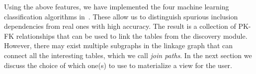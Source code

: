 Using the above features, we have implemented the four machine learning classification algorithms in~\cite{DBLP:conf/webdb/RostinABNL09}. These allow us to distinguish spurious inclusion dependencies from real ones  with high accuracy.
The result is a collection of PK-FK relationships that can be used to link the tables from the discovery module. However, there may exist multiple subgraphs in the linkage graph that can connect all the interesting tables, which we call \emph{join paths}. In the next section we discuss the choice of which one(s) to use to materialize a view for the user.


